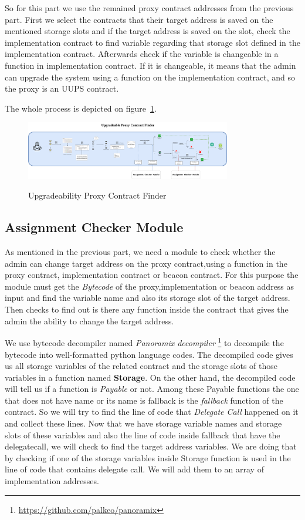 So for this part we use the remained proxy contract addresses from the previous part. First we select the contracts that their target address is saved on the mentioned storage slots and if the target address is saved on the slot, check the implementation contract to find variable regarding that storage slot defined in the implementation contract. Afterwards check if the variable is changeable in a function in implementation contract. If it is changeable, it means that the admin can upgrade the system using a function on the implementation contract, and so the proxy is an UUPS contract. 

The whole process is depicted on figure~\ref{fig:finderModule}.

\begin{figure}[t!]
  \includegraphics[width=0.8\textwidth]{figures/Upgradeability_finder1.png}\label{fig:finderModule}
  \caption{Upgradeability Proxy Contract Finder}
\end{figure}

\subsection{Assignment Checker Module}

As mentioned in the previous part, we need a module to check whether the admin can change target address on the proxy contract,using a function in the proxy contract, implementation contract or beacon contract. For this purpose the module must get the \textit{Bytecode} of the proxy,implementation or beacon address as input and find the variable name and also its storage slot of the target address. Then checks to find out is there any function inside the contract that gives the admin the ability to change the target address.

We use bytecode decompiler named \textit{Panoramix decompiler} \footnote{\url{https://github.com/palkeo/panoramix}} to decompile the bytecode into well-formatted python language codes. The decompiled code gives us all storage variables of the related contract and the storage slots of those variables in a function named \textbf{Storage}. On the other hand, the decompiled code will tell us if a function is \textit{Payable} or not. Among these Payable functions the one that does not have name or its name is fallback is the \textit{fallback} function of the contract. So we will try to find the line of code that \textit{Delegate Call} happened on it and collect these lines. Now that we have storage variable names and storage slots of these variables and also the line of code inside fallback that have the delegatecall, we will check to find the target address variables. We are doing that by checking if one of the storage variables inside Storage function is used in the line of code that contains delegate call. We will add them to an array of implementation addresses.

